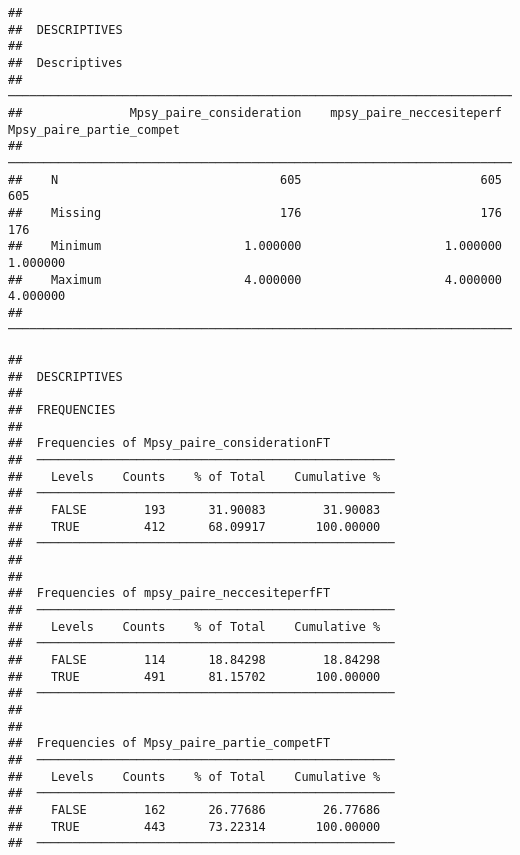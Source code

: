 \documentclass[
]{article}
\begin{document}
\begin{verbatim}
## 
##  DESCRIPTIVES
## 
##  Descriptives                                                                                    
##  ─────────────────────────────────────────────────────────────────────────────────────────────── 
##               Mpsy_paire_consideration    mpsy_paire_neccesiteperf    Mpsy_paire_partie_compet   
##  ─────────────────────────────────────────────────────────────────────────────────────────────── 
##    N                               605                         605                         605   
##    Missing                         176                         176                         176   
##    Minimum                    1.000000                    1.000000                    1.000000   
##    Maximum                    4.000000                    4.000000                    4.000000   
##  ───────────────────────────────────────────────────────────────────────────────────────────────
\end{verbatim}

\begin{verbatim}
## 
##  DESCRIPTIVES
## 
##  FREQUENCIES
## 
##  Frequencies of Mpsy_paire_considerationFT          
##  ────────────────────────────────────────────────── 
##    Levels    Counts    % of Total    Cumulative %   
##  ────────────────────────────────────────────────── 
##    FALSE        193      31.90083        31.90083   
##    TRUE         412      68.09917       100.00000   
##  ────────────────────────────────────────────────── 
## 
## 
##  Frequencies of mpsy_paire_neccesiteperfFT          
##  ────────────────────────────────────────────────── 
##    Levels    Counts    % of Total    Cumulative %   
##  ────────────────────────────────────────────────── 
##    FALSE        114      18.84298        18.84298   
##    TRUE         491      81.15702       100.00000   
##  ────────────────────────────────────────────────── 
## 
## 
##  Frequencies of Mpsy_paire_partie_competFT          
##  ────────────────────────────────────────────────── 
##    Levels    Counts    % of Total    Cumulative %   
##  ────────────────────────────────────────────────── 
##    FALSE        162      26.77686        26.77686   
##    TRUE         443      73.22314       100.00000   
##  ──────────────────────────────────────────────────
\end{verbatim}
\end{document}
